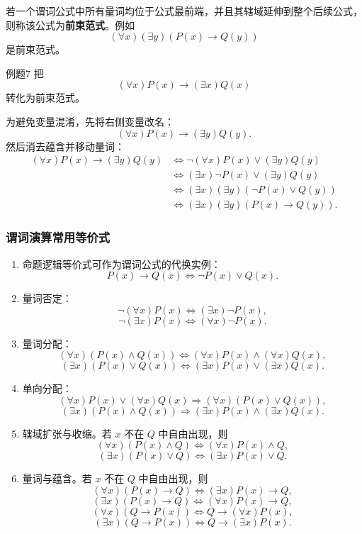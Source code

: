 若一个谓词公式中所有量词均位于公式最前端，并且其辖域延伸到整个后续公式，则称该公式为\textbf{前束范式}。例如
\[
(\forall x)(\exists y)(P(x)\to Q(y))
\]
是前束范式。

\begin{question}{例题7}
	把
	\[
	(\forall x)P(x)\to(\exists x)Q(x)
	\]
	转化为前束范式。
	
	\begin{solution}
	为避免变量混淆，先将右侧变量改名：
	\[
	(\forall x)P(x)\to(\exists y)Q(y).
	\]
	然后消去蕴含并移动量词：
	\begin{align*}
	(\forall x)P(x)\to(\exists y)Q(y)
	&\Leftrightarrow \neg(\forall x)P(x)\lor(\exists y)Q(y)\\
	&\Leftrightarrow (\exists x)\neg P(x)\lor(\exists y)Q(y)\\
	&\Leftrightarrow (\exists x)(\exists y)(\neg P(x)\lor Q(y))\\
	&\Leftrightarrow (\exists x)(\exists y)(P(x)\to Q(y)).
	\end{align*}
	\end{solution}
\end{question}

\subsubsection{谓词演算常用等价式}

\begin{enumerate}
	\item 命题逻辑等价式可作为谓词公式的代换实例：
	\[
	P(x)\to Q(x)\Leftrightarrow\neg P(x)\lor Q(x).
	\]
	\item 量词否定：
	\[
	\neg(\forall x)P(x)\Leftrightarrow(\exists x)\neg P(x),
	\]
	\[
	\neg(\exists x)P(x)\Leftrightarrow(\forall x)\neg P(x).
	\]
	\item 量词分配：
	\[
	(\forall x)(P(x)\land Q(x))\Leftrightarrow(\forall x)P(x)\land(\forall x)Q(x),
	\]
	\[
	(\exists x)(P(x)\lor Q(x))\Leftrightarrow(\exists x)P(x)\lor(\exists x)Q(x).
	\]
	\item 单向分配：
	\[
	(\forall x)P(x)\lor(\forall x)Q(x)\Rightarrow(\forall x)(P(x)\lor Q(x)),
	\]
	\[
	(\exists x)(P(x)\land Q(x))\Rightarrow(\exists x)P(x)\land(\exists x)Q(x).
	\]
	\item 辖域扩张与收缩。若 \(x\) 不在 \(Q\) 中自由出现，则
	\[
	(\forall x)(P(x)\land Q)\Leftrightarrow(\forall x)P(x)\land Q,
	\]
	\[
	(\exists x)(P(x)\lor Q)\Leftrightarrow(\exists x)P(x)\lor Q.
	\]
	\item 量词与蕴含。若 \(x\) 不在 \(Q\) 中自由出现，则
	\[
	(\forall x)(P(x)\to Q)\Leftrightarrow(\exists x)P(x)\to Q,
	\]
	\[
	(\exists x)(P(x)\to Q)\Leftrightarrow(\forall x)P(x)\to Q,
	\]
	\[
	(\forall x)(Q\to P(x))\Leftrightarrow Q\to(\forall x)P(x),
	\]
	\[
	(\exists x)(Q\to P(x))\Leftrightarrow Q\to(\exists x)P(x).
	\]
\end{enumerate}

